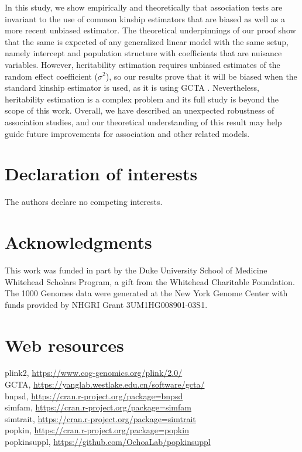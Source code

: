 \documentclass[11pt]{article}
\begin{document}
In this study, we show empirically and theoretically that association tests are invariant to the use of common kinship estimators that are biased as well as a more recent unbiased estimator.
The theoretical underpinnings of our proof show that the same is expected of any generalized linear model with the same setup, namely intercept and population structure with coefficients that are nuisance variables.
However, heritability estimation requires unbiased estimates of the random effect coefficient ($\sigma^2$), so our results prove that it will be biased when the standard kinship estimator is used, as it is using GCTA \citep{yang_gcta:_2011, yang_advantages_2014}.
Nevertheless, heritability estimation is a complex problem and its full study is beyond the scope of this work.
Overall, we have described an unexpected robustness of association studies, and our theoretical understanding of this result may help guide future improvements for association and other related models.



\section*{Declaration of interests}
The authors declare no competing interests.

\section*{Acknowledgments}
This work was funded in part by the Duke University School of Medicine Whitehead Scholars Program, a gift from the Whitehead Charitable Foundation.
The 1000 Genomes data were generated at the New York Genome Center with funds provided by NHGRI Grant 3UM1HG008901-03S1.

\section*{Web resources}
plink2, \url{https://www.cog-genomics.org/plink/2.0/}\\
GCTA, \url{https://yanglab.westlake.edu.cn/software/gcta/}\\
bnpsd, \url{https://cran.r-project.org/package=bnpsd}\\
simfam, \url{https://cran.r-project.org/package=simfam}\\
simtrait, \url{https://cran.r-project.org/package=simtrait}\\
popkin, \url{https://cran.r-project.org/package=popkin}\\
popkinsuppl, \url{https://github.com/OchoaLab/popkinsuppl}
\end{document}
